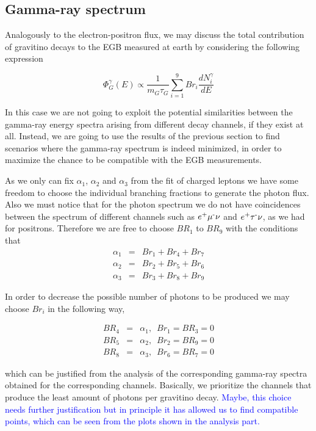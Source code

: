 \documentclass[a4paper,11pt]{article}
\newcommand*{\blue}{\textcolor{blue}}
\begin{document}
\subsection{Gamma-ray spectrum}

Analogously to the electron-positron flux, we may discuss the total contribution of gravitino decays to the EGB measured at earth by considering the following expression

\begin{equation}
\Phi_{G}^{\gamma}(E) \propto\frac{1}{m_{G}\tau_{G}}\sum_{i=1}^{9}Br_{i}\frac{dN^{\gamma}_{i}}{dE}
\end{equation}

In this case we are not going to exploit the potential similarities between the gamma-ray energy spectra arising from different decay channels, if they exist at all. Instead, we are going to use the results of the previous section to find scenarios where the gamma-ray spectrum is indeed minimized, in order to maximize the chance to be compatible with the EGB measurements.

As we only can fix $\alpha_{1}$, $\alpha_{2}$ and $\alpha_{3}$ from the fit of charged leptons we have some freedom to choose the
individual branching fractions to generate the photon flux. Also we must notice that for the photon spectrum we do not have coincidences
between the spectrum of different channels such as $e\text{\textsuperscript{+}}\mu\text{\textsuperscript{-}}\nu$
and $e\text{\textsuperscript{+}}\tau\text{\textsuperscript{-}}\nu$,
as we had for positrons. Therefore we are free to choose $BR{}_{1}$
to $BR_{9}$ with the conditions that
\begin{eqnarray*}
\alpha_{1} & = & Br_{1}+Br_{4}+Br_{7}\\
\alpha_{2} & = & Br_{2}+Br_{5}+Br_{6}\\
\alpha_{3} & = & Br_{3}+Br_{8}+Br_{9}
\end{eqnarray*}


In order to decrease the possible number of photons to be produced we may choose $Br_{i}$ in the following way,

\begin{eqnarray*}
BR_{4} & = & \alpha_{1},\,\,\,Br_{1}=BR_{3}=0\\
BR_{5} & = & \alpha_{2},\,\,\,Br_{2}=BR_{9}=0\\
BR_{8} & = & \alpha_{3},\,\,\,Br_{6}=BR_{7}=0
\end{eqnarray*}

\noindent which can be justified from the analysis of the corresponding gamma-ray spectra obtained for the corresponding channels. Basically,
we prioritize the channels that produce the least amount of photons per gravitino decay. \blue{Maybe, this choice needs further justification but in principle it has allowed us to find compatible points, which can be seen from the plots shown in the analysis part.} 
\end{document}
